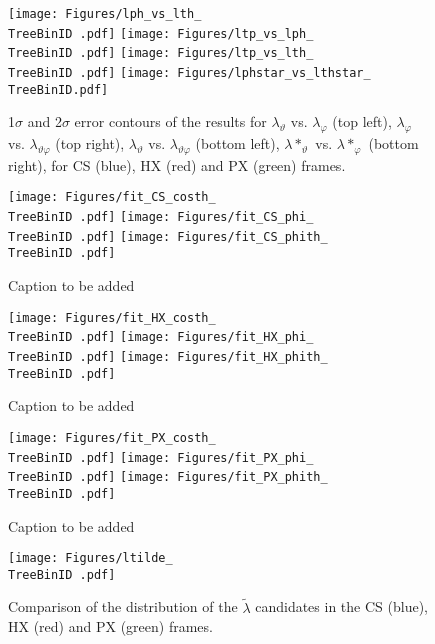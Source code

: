 \documentclass[12pt]{article}
\newcommand{\lamth}{\lambda_\vartheta}
\newcommand{\lamph}{\lambda_\varphi}
\newcommand{\lamthph}{\lambda_{\vartheta\varphi}}
\newcommand{\lamtilde}{\tilde{\lambda}}
\newcommand{\lamthstar}{\lambda*_\vartheta}
\newcommand{\lamphstar}{\lambda*_\varphi}
\providecommand{\TreeBinID}[1]{TreeBinIDDefault_rap1pt1}%
\begin{document}




\begin{figure}[htbp]
\centering
\texttt{[image: Figures/lph\_vs\_lth\_\\TreeBinID .pdf]}
\texttt{[image: Figures/ltp\_vs\_lph\_\\TreeBinID .pdf]}
\texttt{[image: Figures/ltp\_vs\_lth\_\\TreeBinID .pdf]}
\texttt{[image: Figures/lphstar\_vs\_lthstar\_\\TreeBinID.pdf]}
\caption{1$\sigma$ and 2$\sigma$ error contours of the results for $\lamth$
vs. $\lamph$ (top left), $\lamph$ vs. $\lamthph$ (top right), $\lamth$ vs.
$\lamthph$ (bottom left), $\lamthstar$ vs. $\lamphstar$ (bottom right), for CS
(blue), HX (red) and PX (green) frames.}
\end{figure}
\clearpage




\begin{figure}[htbp]
\centering
\texttt{[image: Figures/fit\_CS\_costh\_\\TreeBinID .pdf]}
\texttt{[image: Figures/fit\_CS\_phi\_\\TreeBinID .pdf]}
\texttt{[image: Figures/fit\_CS\_phith\_\\TreeBinID .pdf]}
\caption{Caption to be added}
\end{figure}
\clearpage

\begin{figure}[htbp]
\centering
\texttt{[image: Figures/fit\_HX\_costh\_\\TreeBinID .pdf]}
\texttt{[image: Figures/fit\_HX\_phi\_\\TreeBinID .pdf]}
\texttt{[image: Figures/fit\_HX\_phith\_\\TreeBinID .pdf]}
\caption{Caption to be added}
\end{figure}
\clearpage

\begin{figure}[htbp]
\centering
\texttt{[image: Figures/fit\_PX\_costh\_\\TreeBinID .pdf]}
\texttt{[image: Figures/fit\_PX\_phi\_\\TreeBinID .pdf]}
\texttt{[image: Figures/fit\_PX\_phith\_\\TreeBinID .pdf]}
\caption{Caption to be added}
\end{figure}
\clearpage

\begin{figure}[htbp]
\centering
\texttt{[image: Figures/ltilde\_\\TreeBinID .pdf]}
\caption{Comparison of the distribution of the $\lamtilde$ candidates in the CS
(blue), HX (red) and PX (green) frames.}
\end{figure}
\clearpage
\end{document}
